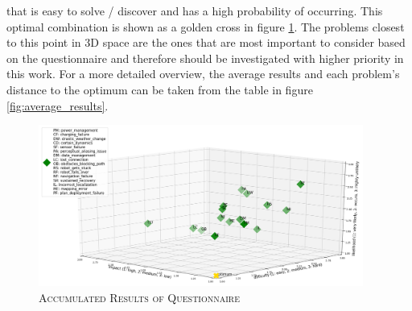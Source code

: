 \documentclass[english, master, utf8]{base/thesis_KBS}
\begin{document}
that is easy to solve / discover and has a high probability of occurring. This optimal combination is shown as a golden cross in figure \ref{fig:questionnaire_results}.
The problems closest to this point in 3D space are the ones that are most important to consider based on the questionnaire and therefore should be 
investigated with higher priority in this work. For a more detailed overview, the average results and each problem's distance to the optimum can be taken from the table 
in figure \ref{fig:average_results}.
\begin{figure}[H]
    \centering
    \includegraphics[width=0.95\textwidth]{pics/questionnaire.png}
    \caption{\textsc{Accumulated Results of Questionnaire}}
    \label{fig:questionnaire_results}
\end{figure}
\end{document}
